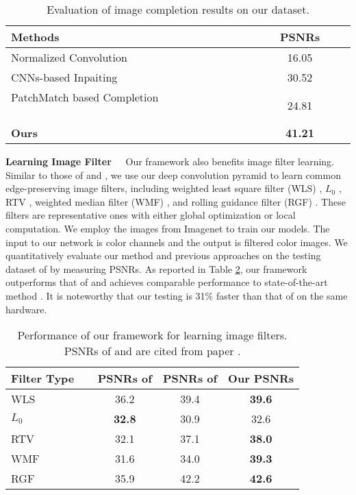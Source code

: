 \documentclass[10pt,twocolumn,letterpaper]{article}
\begin{document}
\begin{table}[t]
\centering
\small
\begin{tabular}{|l|c|}
  \hline
  Methods~~& ~~~~PSNRs~~~~ \\
  \hline
  \hline
  Normalized Convolution \cite{KnutssonW93} & 16.05\\
  \hline
  CNNs-based Inpaiting \cite{RenXYS15} & 30.52\\
  \hline
  PatchMatch based Completion \cite{KormanA11}~~~~~~~~~~~~~~~~~~~& 24.81\\
  \hline
  \textbf{Ours} & \textbf{41.21}\\
  \hline
\end{tabular}\vspace{0.1in}
\caption{Evaluation of image completion results on our dataset.
}\label{tab:img_completion}
\end{table}

\vspace{0.1in}\noindent\textbf{Learning Image Filter~~} Our framework also benefits image
filter learning. Similar to those of \cite{XuRYLJ15} and \cite{LiuP016}, we use our deep
convolution pyramid to learn common edge-preserving image filters, including weighted
least square filter (WLS) \cite{FarbmanFLS08}, $L_0$ \cite{XuLXJ11}, RTV \cite{XuYXJ12},
weighted median filter (WMF) \cite{ZhangXJ14}, and rolling guidance filter (RGF)
\cite{ZhangSXJ14}. These filters are representative ones with either global optimization
or local computation. We employ the images from Imagenet \cite{RussakovskyDSKS15} to
train our models. The input to our network is color channels and the output is filtered
color images. We quantitatively evaluate our method and previous approaches
\cite{XuRYLJ15,LiuP016} on the testing dataset of \cite{XuRYLJ15} by measuring PSNRs. As
reported in Table \ref{tab:imgfilter}, our framework outperforms that of \cite{XuRYLJ15}
and achieves comparable performance to state-of-the-art method \cite{LiuP016}. It is
noteworthy that our testing is 31\% faster than that of \cite{LiuP016} on the same
hardware.


\begin{table}[t]
\centering
\small
\begin{tabular}{|l|c|c|c|}
  \hline
  Filter Type~~& PSNRs of \cite{XuRYLJ15} & PSNRs of \cite{LiuP016} & Our PSNRs\\
  \hline
  \hline
  WLS \cite{FarbmanFLS08} &36.2& {39.4}& \textbf{39.6}\\
  \hline
  $L_0$ \cite{XuLXJ11} &\textbf{32.8}&30.9& {32.6}\\
  \hline
  RTV \cite{XuYXJ12} &32.1&37.1& \textbf{38.0}\\
  \hline
  WMF \cite{ZhangXJ14} &31.6&34.0& \textbf{39.3}\\
  \hline
  RGF \cite{ZhangSXJ14} &35.9& {42.2}& \textbf{42.6}\\
  \hline
\end{tabular}\vspace{0.1in}
\caption{Performance of our framework for learning image filters. PSNRs of
\cite{XuRYLJ15} and \cite{LiuP016} are cited from paper \cite{LiuP016}.
}\label{tab:imgfilter}
\end{table}
\end{document}

